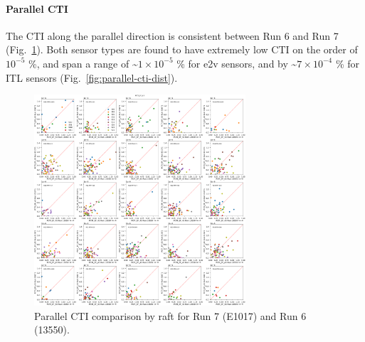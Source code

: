 \clearpage
\paragraph{Parallel CTI}\label{parallel-cti}

The CTI along the parallel direction is consistent between Run 6 and
Run 7 (Fig.~\ref{fig:parallel-cti}). Both sensor types are found to have extremely low CTI on the order of $10^{-5}$ \%,
and span a range of \textasciitilde$1 \times 10^{-5}$ \% for e2v sensors, and
by \textasciitilde$7 \times 10^{-4}$ \% for ITL sensors (Fig.~\ref{fig:parallel-cti-dist}).

\begin{figure}[ht]
\begin{centering}
\includegraphics[width=0.7\textwidth]{figures/baselineCharacterization/13550_E1071_PCTI_EF_43_inset.png}
\caption{Parallel CTI comparison by raft for Run 7 (E1017) and Run 6 (13550).}
\label{fig:parallel-cti}
\end{centering}
\end{figure}

